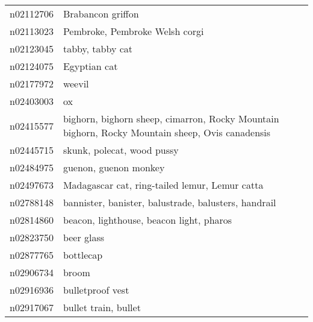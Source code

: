 \begin{appendices}
\begin{scriptsize}
\begin{longtabu}{X|X[4]}
    		n02112706 &                                                                                                          Brabancon griffon \tabularnewline
    		n02113023 &                                                                                             Pembroke, Pembroke Welsh corgi \tabularnewline
    		n02123045 &                                                                                                           tabby, tabby cat \tabularnewline
    		n02124075 &                                                                                                               Egyptian cat \tabularnewline
    		n02177972 &                                                                                                                     weevil \tabularnewline
    		n02403003 &                                                                                                                         ox \tabularnewline
    		n02415577 &                            bighorn, bighorn sheep, cimarron, Rocky Mountain bighorn, Rocky Mountain sheep, Ovis canadensis \tabularnewline
    		n02445715 &                                                                                                 skunk, polecat, wood pussy \tabularnewline
    		n02484975 &                                                                                                      guenon, guenon monkey \tabularnewline
    		n02497673 &                                                                             Madagascar cat, ring-tailed lemur, Lemur catta \tabularnewline
    		n02788148 &                                                                       bannister, banister, balustrade, balusters, handrail \tabularnewline
    		n02814860 &                                                                                   beacon, lighthouse, beacon light, pharos \tabularnewline
    		n02823750 &                                                                                                                 beer glass \tabularnewline
    		n02877765 &                                                                                                                  bottlecap \tabularnewline
    		n02906734 &                                                                                                                      broom \tabularnewline
    		n02916936 &                                                                                                           bulletproof vest \tabularnewline
    		n02917067 &                                                                                                       bullet train, bullet \tabularnewline

\end{longtabu}
\end{scriptsize}
\end{appendices}
